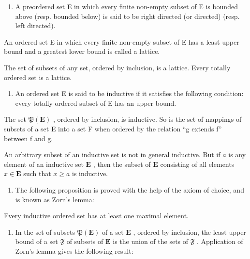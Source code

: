 \begin{enumerate}
\def\labelenumi{\arabic{enumi}.}
\setcounter{enumi}{7}
\tightlist
\item
  A preordered set E in which every finite non-empty subset of E is bounded above (resp. bounded below) is said to be right directed (or directed) (resp. left directed).
\end{enumerate}

An ordered set E in which every finite non-empty subset of E has a least upper bound and a greatest lower bound is called a lattice.

The set of subsets of any set, ordered by inclusion, is a lattice. Every totally ordered set is a lattice.

\begin{enumerate}
\def\labelenumi{\arabic{enumi}.}
\setcounter{enumi}{8}
\tightlist
\item
  An ordered set E is said to be inductive if it satisfies the following condition: every totally ordered subset of E has an upper bound.
\end{enumerate}

The set \(\mathfrak{P}(\mathbf{E})\) , ordered by inclusion, is inductive. So is the set of mappings of subsets of a set E into a set F when ordered by the relation ``g extends f'' between f and g.

An arbitrary subset of an inductive set is not in general inductive. But if \(a\) is any element of an inductive set \(\mathbf{E}\) , then the subset of \(\mathbf{E}\) consisting of all elements \(x \in \mathbf{E}\) such that \(x \geqslant a\) is inductive.

\begin{enumerate}
\def\labelenumi{\arabic{enumi}.}
\setcounter{enumi}{9}
\tightlist
\item
  The following proposition is proved with the help of the axiom of choice, and is known as Zorn's lemma:
\end{enumerate}

Every inductive ordered set has at least one maximal element.

\begin{enumerate}
\def\labelenumi{\arabic{enumi}.}
\setcounter{enumi}{10}
\tightlist
\item
  In the set of subsets \(\mathfrak{P}(\mathbf{E})\) of a set \(\mathbf{E}\) , ordered by inclusion, the least upper bound of a set \(\mathfrak{F}\) of subsets of \(\mathbf{E}\) is the union of the sets of \(\mathfrak{F}\) . Application of Zorn's lemma gives the following result:
\end{enumerate}

